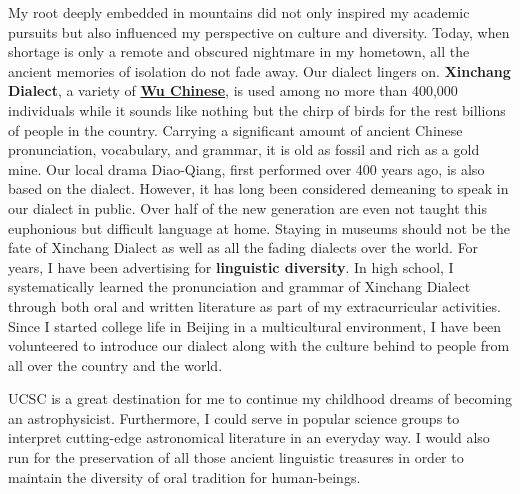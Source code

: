 \documentclass[11pt, a4paper]{awesome-cv} %
\begin{document}
\begin{cvletter}
My root deeply embedded in mountains did not only inspired my academic pursuits but also influenced my perspective on culture and diversity. Today, when shortage is only a remote and obscured nightmare in my hometown, all the ancient memories of isolation do not fade away. Our dialect lingers on. \textbf{Xinchang Dialect}, a variety of \href{https://en.wikipedia.org/wiki/Wu_Chinese}{\textbf{Wu Chinese}}, is used among no more than 400,000 individuals while it sounds like nothing but the chirp of birds for the rest billions of people in the country. Carrying a significant amount of ancient Chinese pronunciation, vocabulary, and grammar, it is old as fossil and rich as a gold mine. Our local drama Diao-Qiang, first performed over 400 years ago, is also based on the dialect. However, it has long been considered demeaning to speak in our dialect in public. Over half of the new generation are even not taught this euphonious but difficult language at home. Staying in museums should not be the fate of Xinchang Dialect as well as all the fading dialects over the world. For years, I have been advertising for \textbf{linguistic diversity}. In high school, I systematically learned the pronunciation and grammar of Xinchang Dialect through both oral and written literature as part of my extracurricular activities. Since I started college life in Beijing in a multicultural environment, I have been volunteered to introduce our dialect along with the culture behind to people from all over the country and the world. 

UCSC is a great destination for me to continue my childhood dreams of becoming an astrophysicist. Furthermore, I could serve in popular science groups to interpret cutting-edge astronomical literature in an everyday way. I would also run for the preservation of all those ancient linguistic treasures in order to maintain the diversity of oral tradition for human-beings.


\end{cvletter}


\end{document}
